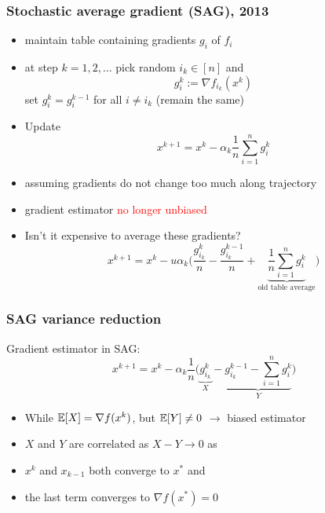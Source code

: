 \documentclass[aspectratio=149]{beamer}
\begin{document}
\begin{frame}
  \frametitle{Stochastic average gradient (SAG), 2013}
  \begin{itemize}
    \item maintain table containing gradients $g_i$ of $f_i$
    \item at step $k = 1,2, \dots$ pick random $i_k \in [n]$ and
          \begin{equation}
            g_i^k := \nabla f_{i_k}(x^{k})
          \end{equation}
          set $g_{i}^k = g_i^{k-1}$ for all $i\neq i_k$ (remain the same)
    \item Update
          \begin{equation}
            x^{k+1} = x^k - \alpha_k \frac{1}{n} \sum_{i=1}^{n} g_i^k
          \end{equation}
    \item assuming gradients do not change too much along trajectory
    \item gradient estimator \textcolor{red}{no longer unbiased}
    \item Isn't it expensive to average these gradients?
          \begin{equation}
            x^{k+1} = x^k -u \alpha_k  \Big( \frac{g_{i_k}^k}{n} - \frac{g_{i_k}^{k-1}}{n} + \underbrace{\frac{1}{n}\sum_{i=1}^{n} g_i^k}_{\text{old table average}} \Big)
          \end{equation}
  \end{itemize}
\end{frame}


\begin{frame}
  \frametitle{SAG variance reduction}
  Gradient estimator in SAG:
  \begin{equation}
    x^{k+1} = x^k - \alpha_k \frac{1}{n} \Big( \underbrace{g_{i_k}^k}_X - \underbrace{g_{i_k}^{k-1} - \sum_{i=1}^{n} g_i^k}_{Y} \Big)
  \end{equation}
  \begin{itemize}
    \item While $\mathbb{E}[X] = \nabla f(x^k)$, but $\mathbb{E}[Y]\neq 0$ $\rightarrow $ biased estimator
    \item $X$ and $Y$ are correlated as $X-Y \to 0$  as
    \item $x^k$ and $x_{k-1}$ both converge to $x^*$ and
    \item the last term converges to $\nabla f(x^*)= 0$
  \end{itemize}
\end{frame}
\end{document}
